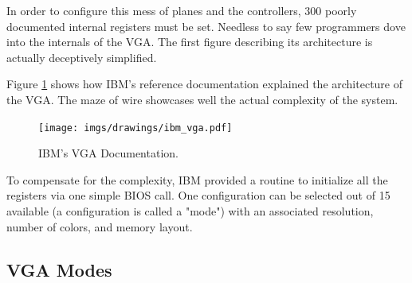 \documentclass[book.tex]{subfiles}
\begin{document}
\par
In order to configure this mess of planes and the controllers, 300 poorly documented internal registers must be set. Needless to say few programmers dove into the internals of the VGA. The first figure describing its architecture is actually deceptively simplified.\\
\par
 Figure \ref{fig:ibm_vga} shows how IBM's reference documentation explained the architecture of the VGA. The maze of wire showcases well the actual complexity of the system.\\
 \par
 \vspace{10pt}
 \begin{figure}[H]
\centering
\texttt{[image: imgs/drawings/ibm\_vga.pdf]}
\caption{IBM's VGA Documentation.}
\label{fig:ibm_vga}
\end{figure}

\bigskip



To compensate for the complexity, IBM provided a routine to initialize all the registers via one simple BIOS call. One configuration can be selected out of 15 available (a configuration is called a "mode") with an associated resolution, number of colors, and memory layout.\pagebreak

\subsection{VGA Modes}
\end{document}
